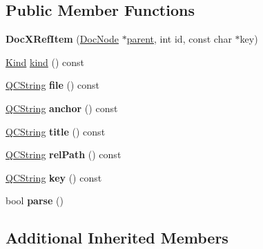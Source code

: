 \subsection*{Public Member Functions}
\begin{DoxyCompactItemize}
\item 
\mbox{\label{class_doc_x_ref_item_a2dd2cde9203334f102bf5eb810b8f0a0}} 
{\bfseries Doc\+X\+Ref\+Item} (\mbox{\hyperlink{class_doc_node}{Doc\+Node}} $\ast$\mbox{\hyperlink{class_doc_node_a73e8ad29a91cfceb0968eb00db71a23d}{parent}}, int id, const char $\ast$key)
\item 
\mbox{\hyperlink{class_doc_node_aebd16e89ca590d84cbd40543ea5faadb}{Kind}} \mbox{\hyperlink{class_doc_x_ref_item_a8659267ac3981eedcbb39be9ab3c9c92}{kind}} () const
\item 
\mbox{\label{class_doc_x_ref_item_ab4fe34f455483d8db30c22030115bfdf}} 
\mbox{\hyperlink{class_q_c_string}{Q\+C\+String}} {\bfseries file} () const
\item 
\mbox{\label{class_doc_x_ref_item_a60de194481baf1f130d2b3a3cee3e4b5}} 
\mbox{\hyperlink{class_q_c_string}{Q\+C\+String}} {\bfseries anchor} () const
\item 
\mbox{\label{class_doc_x_ref_item_af174176c1e034a106469af615e09854e}} 
\mbox{\hyperlink{class_q_c_string}{Q\+C\+String}} {\bfseries title} () const
\item 
\mbox{\label{class_doc_x_ref_item_aae5b3eddf34eeeed918a4a650dd2ded3}} 
\mbox{\hyperlink{class_q_c_string}{Q\+C\+String}} {\bfseries rel\+Path} () const
\item 
\mbox{\label{class_doc_x_ref_item_a8c0952cf58cfec58ec321265a91f16be}} 
\mbox{\hyperlink{class_q_c_string}{Q\+C\+String}} {\bfseries key} () const
\item 
\mbox{\label{class_doc_x_ref_item_acfb3aacf4b559a4b9fb4fb5b2dc960bc}} 
bool {\bfseries parse} ()
\end{DoxyCompactItemize}
\subsection*{Additional Inherited Members}


